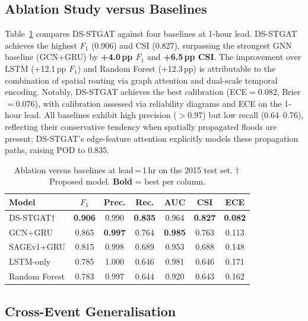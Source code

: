 \documentclass[10pt,twocolumn]{article}
\begin{document}
\subsection{Ablation Study versus Baselines}

Table~\ref{tab:ablation} compares DS-STGAT against four baselines at
1-hour lead.
DS-STGAT achieves the highest $F_1$ (0.906) and CSI (0.827), surpassing
the strongest GNN baseline (GCN+GRU) by \textbf{+4.0\,pp $F_1$} and
\textbf{+6.5\,pp CSI}.
The improvement over LSTM (+12.1\,pp $F_1$) and Random Forest
(+12.3\,pp) is attributable to the combination of spatial routing via
graph attention and dual-scale temporal encoding.
Notably, DS-STGAT achieves the best calibration (ECE${=}0.082$,
Brier${=}0.076$), with calibration assessed via reliability diagrams
and ECE on the 1-hour lead.
All baselines exhibit high precision ($>0.97$) but low recall
(0.64--0.76), reflecting their conservative tendency when spatially
propagated floods are present; DS-STGAT's edge-feature attention
explicitly models these propagation paths, raising POD to 0.835.

\begin{table}[t]
\small
\caption{Ablation versus baselines at lead\,=\,1\,hr on the 2015 test set.
         $\dagger$\,Proposed model. \textbf{Bold} = best per column.}
\label{tab:ablation}
\centering
\setlength{\tabcolsep}{4pt}
\begin{tabular}{@{}lcccccc@{}}
\toprule
Model & $F_1$ & Prec. & Rec. & AUC & CSI & ECE \\
\midrule
\rowcolor{proprow}
DS-STGAT$\dagger$ & \textbf{0.906} & 0.990 & \textbf{0.835} & 0.964 & \textbf{0.827} & \textbf{0.082} \\
GCN+GRU           & 0.865 & \textbf{0.997} & 0.764 & \textbf{0.985} & 0.763 & 0.113 \\
SAGEv1+GRU        & 0.815 & 0.998 & 0.689 & 0.953 & 0.688 & 0.148 \\
LSTM-only         & 0.785 & 1.000 & 0.646 & 0.981 & 0.646 & 0.171 \\
Random Forest     & 0.783 & 0.997 & 0.644 & 0.920 & 0.643 & 0.162 \\
\bottomrule
\end{tabular}
\end{table}

\subsection{Cross-Event Generalisation}
\end{document}
